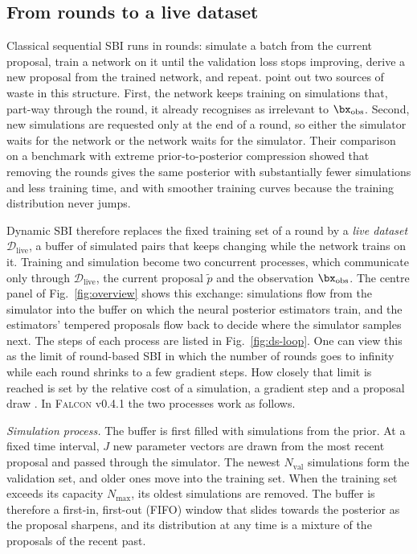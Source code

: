 \subsection{From rounds to a live dataset}
\label{sec:ds-loop}

Classical sequential SBI runs in rounds: simulate a batch from the current
proposal, train a network on it until the validation loss stops improving,
derive a new proposal from the trained network, and repeat. \citet{lyu_dynamic_2026}
point out two sources of waste in this structure. First, the network keeps
training on simulations that, part-way through the round, it already
recognises as irrelevant to $\bx_{\mathrm{obs}}$. Second, new simulations are
requested only at the end of a round, so either the simulator waits for the
network or the network waits for the simulator. Their comparison on a
benchmark with extreme prior-to-posterior compression showed that removing
the rounds gives the same posterior with substantially fewer simulations and
less training time, and with smoother training curves because the training
distribution never jumps.

Dynamic SBI therefore replaces the fixed training set of a round by a
\emph{live dataset} $\mathcal{D}_{\mathrm{live}}$, a buffer of simulated pairs
that keeps changing while the network trains on it. Training and simulation
become two concurrent processes, which communicate only through
$\mathcal{D}_{\mathrm{live}}$, the current proposal $\tilde p$ and the
observation $\bx_{\mathrm{obs}}$. The centre panel of Fig.~\ref{fig:overview}
shows this exchange: simulations flow from the simulator into the buffer on
which the neural posterior estimators train, and the estimators' tempered
proposals flow back to decide where the simulator samples next. The steps of
each process are listed in Fig.~\ref{fig:ds-loop}. One can view this
as the limit of round-based SBI in which the number of rounds goes to infinity
while each round shrinks to a few gradient steps. How closely that limit is
reached is set by the relative cost of a simulation, a gradient step and a
proposal draw \citep{lyu_dynamic_2026}. In \textsc{Falcon} v0.4.1 the two
processes work as follows.

\emph{Simulation process.} The buffer is first filled with simulations from
the prior. At a fixed time interval, $J$ new parameter vectors are drawn from
the most recent proposal and passed through the simulator. The newest
$N_{\mathrm{val}}$ simulations form the validation set, and older ones move
into the training set. When the training set exceeds its capacity $N_{\max}$,
its oldest simulations are removed. The buffer is therefore a first-in,
first-out (FIFO) window that slides towards the posterior as the proposal
sharpens, and its distribution at any time is a mixture of the proposals of
the recent past.

